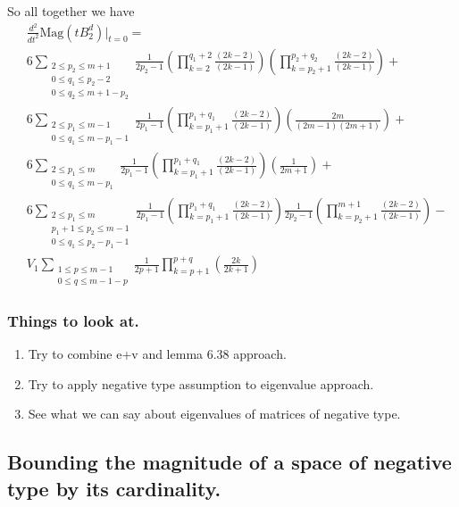 \documentclass[11pt]{article}
\theoremstyle{definition}
\theoremstyle{definition}
\theoremstyle{plain}
\theoremstyle{plain}
\theoremstyle{plain}
\theoremstyle{definition}
\begin{document}
So all together we have
\begin{align*}
&\frac{d^2}{dt^2}\text{Mag}(tB_2^d)\big\vert_{t=0} = \\
&6\sum\limits_{\substack{2\leq p_2\leq m+1 \\ 0\leq q_1 \leq p_2-2 \\ 0\leq q_2 \leq m+1-p_2}}\frac{1}{2p_2-1}\left(\prod\limits_{k=2}^{q_1+2}\frac{(2k-2)}{(2k-1)}\right)\left(\prod\limits_{k=p_2+1}^{p_2+q_2}\frac{(2k-2)}{(2k-1)}\right) + \\
&6\sum\limits_{\substack{2\leq p_1\leq m-1 \\ 0\leq q_1\leq m-p_1-1}}\frac{1}{2p_1-1}\left(\prod\limits_{k=p_1+1}^{p_1+q_1}\frac{(2k-2)}{(2k-1)}\right)\left(\frac{2m}{(2m-1)(2m+1)}\right) + \\
&6\sum\limits_{\substack{2\leq p_1\leq m \\ 0\leq q_1\leq m-p_1}}\frac{1}{2p_1-1}\left(\prod\limits_{k=p_1+1}^{p_1+q_1}\frac{(2k-2)}{(2k-1)}\right)\left(\frac{1}{2m+1}\right) + \\
&6\sum\limits_{\substack{2\leq p_1\leq m \\ p_1+1\leq p_2 \leq m-1 \\ 0\leq q_1\leq p_2-p_1-1 }}\frac{1}{2p_1-1}\left(\prod\limits_{k=p_1+1}^{p_1+q_1}\frac{(2k-2)}{(2k-1)}\right)\frac{1}{2p_2-1}\left(\prod\limits_{k=p_2+1}^{m+1}\frac{(2k-2)}{(2k-1)}\right) - \\
&V_{1}\sum\limits_{\substack{1\leq p \leq m-1 \\ 0 \leq q \leq m - 1 - p}}\frac{1}{2p+1}\prod\limits_{k=p+1}^{p+q}\left(\frac{2k}{2k+1}\right)
\end{align*}

\pagebreak

\subsubsection*{Things to look at.}
\begin{enumerate}
\item Try to combine e+v and lemma 6.38 approach.
\item Try to apply negative type assumption to eigenvalue approach.
\item See what we can say about eigenvalues of matrices of negative type.
\end{enumerate}

\subsection*{Bounding the magnitude of a space of negative type by its cardinality.}
\end{document}
